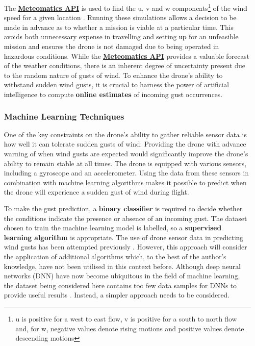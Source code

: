 The \href{https://www.meteomatics.com/}{\textbf{Meteomatics API}}  is used to find the u, v and w components\footnote{u is positive for a west to east flow, v is positive for a south to north flow and, for w, negative values denote rising motions and positive values denote descending motions} of the wind speed for a given location \cite{meteomatics_wind_speed}. Running these simulations allows a decision to be made in advance as to whether a mission is viable at a particular time. This avoids both unnecessary expense in travelling and setting up for an unfeasible mission and ensures the drone is not damaged due to being operated in hazardous conditions. While the \href{https://www.meteomatics.com/}{\textbf{Meteomatics API}}
provides a valuable forecast of the weather conditions, there is an inherent degree of uncertainty present due to the random nature of gusts of wind. To enhance the drone's ability to withstand sudden wind gusts, it is crucial to harness the power of artificial intelligence to compute \textbf{online estimates} of incoming gust occurrences. 

\subsubsection{Machine Learning Techniques}
\label{sec:mlalgos}

One of the key constraints on the drone's ability to gather reliable sensor data is how well it can tolerate sudden gusts of wind. Providing the drone with advance warning of when wind gusts are expected would significantly improve the drone's ability to remain stable at all times. The drone is equipped with various sensors, including a gyroscope and an accelerometer. Using the data from these sensors in combination with machine learning algorithms makes it possible to predict when the drone will experience a sudden gust of wind during flight.

To make the gust prediction, a \textbf{binary classifier} is required to decide whether the conditions indicate the presence or absence of an incoming gust. The dataset chosen to train the machine learning model is labelled, so a \textbf{supervised learning algorithm} is appropriate. The use of drone sensor data in predicting wind gusts has been attempted previously \cite{gu2018wind}. However, this approach will consider the application of additional algorithms which, to the best of the author's knowledge, have not been utilised in this context before. Although deep neural networks (DNN) have now become ubiquitous in the field of machine learning, the dataset being considered here contains too few data samples for DNNs to provide useful results \cite{golestaneh2024samplesneededtraindeep}. Instead, a simpler approach needs to be considered. 

